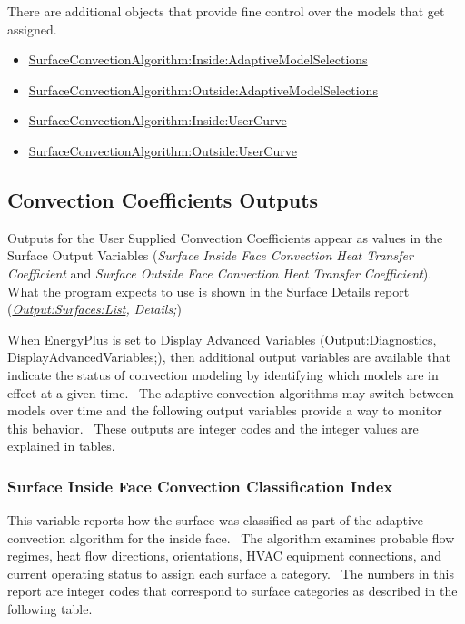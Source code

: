 There are additional objects that provide fine control over the models that get assigned.

\begin{itemize}
\item
  \hyperref[surfaceconvectionalgorithminsideadaptivemodelselections]{SurfaceConvectionAlgorithm:Inside:AdaptiveModelSelections}
\item
  \hyperref[surfaceconvectionalgorithmoutsideadaptivemodelselections]{SurfaceConvectionAlgorithm:Outside:AdaptiveModelSelections}
\item
  \hyperref[surfaceconvectionalgorithminsideusercurve]{SurfaceConvectionAlgorithm:Inside:UserCurve}
\item
  \hyperref[surfaceconvectionalgorithmoutsideusercurve]{SurfaceConvectionAlgorithm:Outside:UserCurve}
\end{itemize}

\subsection{Convection Coefficients Outputs}\label{convection-coefficients-outputs}

Outputs for the User Supplied Convection Coefficients appear as values in the Surface Output Variables (\emph{Surface Inside Face Convection Heat Transfer Coefficient} and \emph{Surface Outside Face Convection Heat Transfer Coefficient}). What the program expects to use is shown in the Surface Details report (\emph{\hyperref[outputsurfaceslist]{Output:Surfaces:List}, Details;})

When EnergyPlus is set to Display Advanced Variables (\hyperref[outputdiagnostics]{Output:Diagnostics}, DisplayAdvancedVariables;), then additional output variables are available that indicate the status of convection modeling by identifying which models are in effect at a given time.~ The adaptive convection algorithms may switch between models over time and the following output variables provide a way to monitor this behavior.~ These outputs are integer codes and the integer values are explained in tables.

\subsubsection{Surface Inside Face Convection Classification Index}\label{surface-inside-face-convection-classification-index}

This variable reports how the surface was classified as part of the adaptive convection algorithm for the inside face.~ The algorithm examines probable flow regimes, heat flow directions, orientations, HVAC equipment connections, and current operating status to assign each surface a category.~ The numbers in this report are integer codes that correspond to surface categories as described in the following table.

